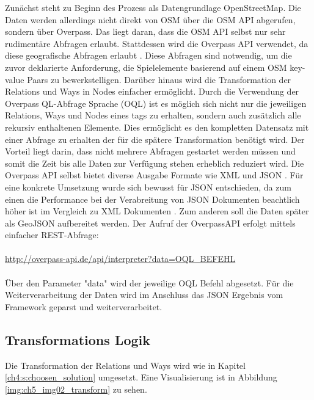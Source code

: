 Zunächst steht zu Beginn des Prozess als Datengrundlage OpenStreetMap.
Die Daten werden allerdings nicht direkt von OSM über die OSM API abgerufen, sondern über Overpass. Das liegt daran, dass die OSM API selbst nur sehr rudimentäre Abfragen erlaubt.
Stattdessen wird die Overpass API verwendet, da diese geografische Abfragen erlaubt \cite{Meyer.2013}.
Diese Abfragen sind notwendig, um die zuvor deklarierte Anforderung, die Spielelemente basierend auf einem OSM key-value Paars zu bewerkstelligen. Darüber hinaus wird die Transformation der Relations und Ways in Nodes einfacher ermöglicht.
Durch die Verwendung der Overpass QL-Abfrage Sprache (OQL) ist es möglich sich nicht nur die jeweiligen Relations, Ways und Nodes eines tags zu erhalten, sondern auch zusätzlich alle rekursiv enthaltenen Elemente. Dies ermöglicht es den kompletten Datensatz mit einer Abfrage zu erhalten der für die spätere Transformation benötigt wird. Der Vorteil liegt darin, dass nicht mehrere Abfragen gestartet werden müssen und somit die Zeit bis alle Daten zur Verfügung stehen erheblich reduziert wird. Die Overpass API selbst bietet diverse Ausgabe Formate wie XML und JSON \cite{Olbricht.2014}. Für eine konkrete Umsetzung wurde sich bewusst für JSON entschieden, da zum einen die Performance bei der Verabreitung von JSON Dokumenten beachtlich höher ist im Vergleich zu XML Dokumenten \cite{Nurseitov.2009}. Zum anderen soll die Daten später als GeoJSON aufbereitet werden.
Der Aufruf der OverpassAPI erfolgt mittels einfacher REST-Abfrage:
\\\\
\url{http://overpass-api.de/api/interpreter?data=OQL_BEFEHL}
\\\\
Über den Parameter "data" wird der jeweilige OQL Befehl abgesetzt.
Für die Weiterverarbeitung der Daten wird im Anschluss das JSON Ergebnis vom Framework geparst und weiterverarbeitet.

\subsection*{Transformations Logik}

Die Transformation der Relations und Ways wird wie in Kapitel \ref{ch4:s:choosen_solution} umgesetzt. Eine Visualisierung ist in Abbildung \ref{img:ch5_img02_transform} zu sehen.

